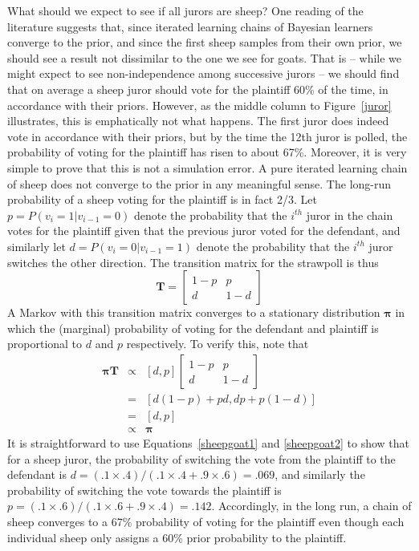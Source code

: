 \documentclass[doc]{apa6}
\begin{document}
What should we expect to see if all jurors are {\sc sheep}? One reading of the literature suggests that, since iterated learning chains of Bayesian learners converge to the prior, and since the first {\sc sheep} samples from their own prior, we should see a result not dissimilar to the one we see for {\sc goats}. That is -- while we might expect to see non-independence among successive jurors -- we should find that on average a {\sc sheep} juror should vote for the plaintiff 60\% of the time, in accordance with their priors. However, as the middle column to Figure~\ref{juror} illustrates, this is emphatically not what happens. The first juror does indeed vote in accordance with their priors, but by the time the 12th juror is polled, the probability of voting for the plaintiff has risen to about 67\%. Moreover, it is very simple to prove that this is not a simulation error. A pure iterated learning chain of {\sc sheep} does not converge to the prior in any meaningful sense. The long-run probability of a {\sc sheep} voting for the plaintiff is in fact 2/3. Let $p = P(v_i=1 | v_{i-1}=0)$ denote the probability that the $i^{th}$ juror in the chain votes for the plaintiff given that the previous juror voted for the defendant, and similarly let $d = P(v_i = 0 | v_{i-1}=1)$ denote the probability that the $i^{th}$ juror switches the other direction. The transition matrix for the strawpoll is thus 
$$
\bm{T} 
= \left[ \begin{array}{cc} 1-p & p \\ d & 1-d \end{array}\right]
$$
A Markov with this transition matrix converges to a stationary distribution $\bm{\pi}$ in which the (marginal) probability of voting for the defendant and plaintiff is proportional to $d$ and $p$ respectively. To verify this, note that 
\begin{eqnarray*}
\bm{\pi} \bm{T}  &\propto& [d, p] \left[ \begin{array}{cc} 1-p & p \\ d & 1-d \end{array}\right] \\
&=& [d(1-p) + pd, dp + p(1-d)] \\
&=& [d, p]\\
&\propto& \bm{\pi}
\end{eqnarray*}
It is straightforward to use Equations~\ref{sheepgoat1} and \ref{sheepgoat2} to show that for a {\sc sheep} juror, the probability of switching the vote from the plaintiff to the defendant is $d = (.1 \times .4) / (.1 \times .4 + .9 \times.6) = .069$, and similarly the probability of switching the vote towards the plaintiff is $p = (.1 \times .6) / (.1 \times .6 + .9 \times.4) = .142$. Accordingly, in the long run, a chain of {\sc sheep} converges to a 67\% probability of voting for the plaintiff even though each individual {\sc sheep} only assigns a 60\% prior probability to the plaintiff. 
\end{document}
